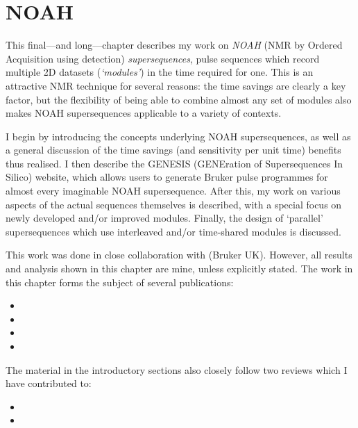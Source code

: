 \chapter{NOAH}
\label{chpt:noah}

This final---and long---chapter describes my work on \textit{NOAH} (NMR by Ordered Acquisition using \proton{} detection) \textit{supersequences}, pulse sequences which record multiple 2D datasets (\textit{`modules'}) in the time required for one.
This is an attractive NMR technique for several reasons: the time savings are clearly a key factor, but the flexibility of being able to combine almost any set of modules also makes NOAH supersequences applicable to a variety of contexts.

I begin by introducing the concepts underlying NOAH supersequences, as well as a general discussion of the time savings (and sensitivity per unit time) benefits thus realised.
I then describe the GENESIS (GENEration of Supersequences In Silico) website, which allows users to generate Bruker pulse programmes for almost every imaginable NOAH supersequence.
After this, my work on various aspects of the actual sequences themselves is described, with a special focus on newly developed and/or improved modules.
Finally, the design of `parallel' supersequences which use interleaved and/or time-shared modules is discussed.

This work was done in close collaboration with \EK{} (Bruker UK).
However, all results and analysis shown in this chapter are mine, unless explicitly stated.
The work in this chapter forms the subject of several publications:

\begin{itemize}
    \item {}
    \item {}
    \item {}
    \item {}
\end{itemize}

The material in the introductory sections also closely follow two reviews which I have contributed to:
\begin{itemize}
    \item {}
    \item {}
\end{itemize}

\clearpage










\printbibliography[heading=subbibnumbered]{}
